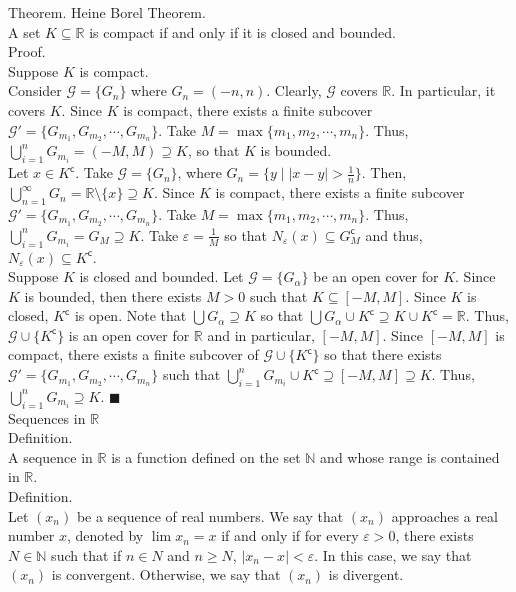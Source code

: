 \documentclass[twocolumn]{article}
\newcommand{\qed}{$\blacksquare$}
\newcommand{\COMPLEMENT}{^\mathsf{c}}
\let\complement\COMPLEMENT
\let\eps\varepsilon
\newcommand{\naturals}{\mathbb{N}}
\newcommand{\reals}{\mathbb{R}}
\begin{document}
Theorem. Heine Borel Theorem. \\
A set $K \subseteq \reals$ is compact if and only if it is closed and bounded. \\
Proof. \\
Suppose $K$ is compact. \\
Consider $\mathcal{G} = \{ G_n \}$ where $G_n = (-n, n)$. Clearly, $\mathcal{G}$ covers $\reals$. In particular, it covers $K$. Since $K$ is compact, there exists a finite subcover $\mathcal{G'} = \{ G_{m_1}, G_{m_2}, \cdots, G_{m_n} \}$. Take $M = \max \{ m_1, m_2, \cdots, m_n \}$. Thus, $\bigcup_{i = 1}^n G_{m_i} = (-M, M) \supseteq K$, so that $K$ is bounded. \\
Let $x \in K\complement$. Take $\mathcal{G} = \{ G_n \}$, where $G_n = \{ y \mid |x - y| > \frac{1}{n} \}$. Then, $\bigcup_{n = 1}^\infty G_n = \reals \setminus \{ x \} \supseteq K$. Since $K$ is compact, there exists a finite subcover $\mathcal{G'} = \{ G_{m_1}, G_{m_2}, \cdots, G_{m_n} \}$. Take $M = \max \{ m_1, m_2, \cdots, m_n \}$. Thus, $\bigcup_{i = 1}^n G_{m_i} = G_M \supseteq K$. Take $\eps = \frac{1}{M}$ so that $N_\eps(x) \subseteq G_M\complement$ and thus, $N_\eps(x) \subseteq K\complement$. \\
Suppose $K$ is closed and bounded. Let $\mathcal{G} = \{ G_\alpha \}$ be an open cover for $K$. Since $K$ is bounded, then there exists $M > 0$ such that $K \subseteq [-M, M]$. Since $K$ is closed, $K\complement$ is open. Note that $\bigcup G_\alpha \supseteq K$ so that $\bigcup G_\alpha \cup K\complement \supseteq K \cup K\complement = \reals$. Thus, $\mathcal{G} \cup \{ K\complement \}$ is an open cover for $\reals$ and in particular, $[-M, M]$. Since $[-M, M]$ is compact, there exists a finite subcover of $\mathcal{G} \cup \{ K\complement \}$ so that there exists $\mathcal{G'} = \{ G_{m_1}, G_{m_2}, \cdots, G_{m_n} \}$ such that $\bigcup_{i = 1}^n G_{m_i} \cup K\complement \supseteq [-M, M] \supseteq K$. Thus, $\bigcup_{i = 1}^n G_{m_i} \supseteq K$. \qed \\

Sequences in $\reals$ \\

Definition. \\
A sequence in $\reals$ is a function defined on the set $\naturals$ and whose range is contained in $\reals$. \\

Definition. \\
Let $(x_n)$ be a sequence of real numbers. We say that $(x_n)$ approaches a real number $x$, denoted by $\lim x_n = x$ if and only if for every $\eps > 0$, there exists $N \in \naturals$ such that if $n \in N$ and $n \geq N$, $|x_n - x| < \eps$. In this case, we say that $(x_n)$ is convergent. Otherwise, we say that $(x_n)$ is divergent. \\
\end{document}
